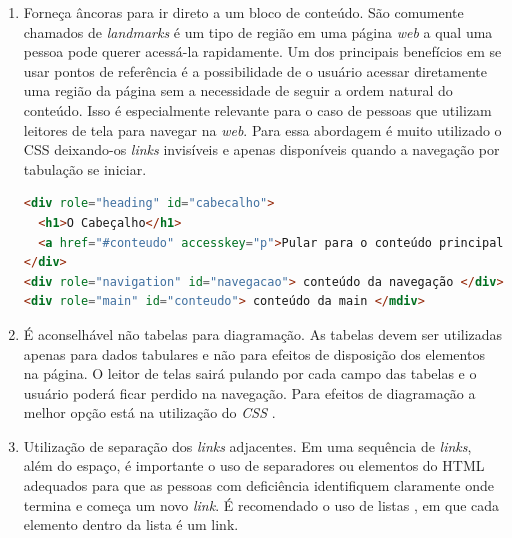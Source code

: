 {{{{\begin{enumerate}
\begin{itemize}
{\begin{lstlisting}[language=html,caption=Uso do atributo tabindex]
<label>
    Primeiro na lista de tabulação:<input type="text">
</label>
<div tabindex="0">
Próximo item na lista de tabulação, mesmo não sendo um elemento que receberia o foco natural
</div>
<div>Não será focado pois está sem o tabindex</div>
\end{lstlisting}}
        \item Adicione o atributo \lstinline{title} aos \textit{links}, ele mostrará uma descrição do lugar pra onde o \textit{link} leva, melhorando a navegação.
{\begin{lstlisting}[language=html,caption=usando o atributo title]
<a href="#" onclick="abrePopup()" onkeypress="abrePopup()" title="Abre uma janela pop-up com Javascript">Ver mais informações</a>
\end{lstlisting}}
    \end{itemize}
    \item Forneça âncoras para ir direto a um bloco de conteúdo. São comumente chamados de \textit{landmarks} é um tipo de região em uma página \textit{web} a qual uma pessoa pode querer acessá-la rapidamente. Um dos principais benefícios em se usar pontos de referência é a possibilidade de o usuário acessar diretamente uma região da página sem a necessidade de seguir a ordem natural do conteúdo. Isso é especialmente relevante para o caso de pessoas que utilizam leitores de tela para navegar na \textit{web}. Para essa abordagem é muito utilizado o CSS \cite{CSS} deixando-os \textit{links} invisíveis e apenas disponíveis quando a navegação por tabulação se iniciar. 
{\begin{lstlisting}[language=html,caption=usando landmarks]
<div role="heading" id="cabecalho"> 
  <h1>O Cabeçalho</h1> 
  <a href="#conteudo" accesskey="p">Pular para o conteúdo principals</a> 
</div> 
<div role="navigation" id="navegacao"> conteúdo da navegação </div>
<div role="main" id="conteudo"> conteúdo da main </mdiv>
\end{lstlisting}}
    \item É aconselhável não tabelas para diagramação. As tabelas devem ser utilizadas apenas para dados tabulares e não para efeitos de disposição dos elementos na página. O leitor de telas sairá pulando por cada campo das tabelas e o usuário poderá ficar perdido na navegação. Para efeitos de diagramação a melhor opção está na utilização do \textit{CSS} \cite{CSS}.
    \item Utilização de separação dos \textit{links} adjacentes. Em uma sequência de \textit{links}, além do espaço, é importante o uso de separadores ou elementos do HTML \cite{HTML} adequados para que as pessoas com deficiência identifiquem claramente onde termina e começa um novo \textit{link}. É recomendado o uso de listas , em que cada elemento dentro da lista é um link.

\end{enumerate}}}}}
